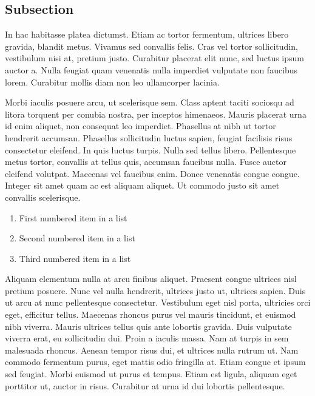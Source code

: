 \documentclass[10pt, a4paper, twocolumn]{article} %
\begin{document}

\subsection{Subsection}

In hac habitasse platea dictumst. Etiam ac tortor fermentum, ultrices libero gravida, blandit metus. Vivamus sed convallis felis. Cras vel tortor sollicitudin, vestibulum nisi at, pretium justo. Curabitur placerat elit nunc, sed luctus ipsum auctor a. Nulla feugiat quam venenatis nulla imperdiet vulputate non faucibus lorem. Curabitur mollis diam non leo ullamcorper lacinia.

Morbi iaculis posuere arcu, ut scelerisque sem. Class aptent taciti sociosqu ad litora torquent per conubia nostra, per inceptos himenaeos. Mauris placerat urna id enim aliquet, non consequat leo imperdiet. Phasellus at nibh ut tortor hendrerit accumsan. Phasellus sollicitudin luctus sapien, feugiat facilisis risus consectetur eleifend. In quis luctus turpis. Nulla sed tellus libero. Pellentesque metus tortor, convallis at tellus quis, accumsan faucibus nulla. Fusce auctor eleifend volutpat. Maecenas vel faucibus enim. Donec venenatis congue congue. Integer sit amet quam ac est aliquam aliquet. Ut commodo justo sit amet convallis scelerisque.

\begin{enumerate}
	\item First numbered item in a list
	\item Second numbered item in a list
	\item Third numbered item in a list
\end{enumerate}

Aliquam elementum nulla at arcu finibus aliquet. Praesent congue ultrices nisl pretium posuere. Nunc vel nulla hendrerit, ultrices justo ut, ultrices sapien. Duis ut arcu at nunc pellentesque consectetur. Vestibulum eget nisl porta, ultricies orci eget, efficitur tellus. Maecenas rhoncus purus vel mauris tincidunt, et euismod nibh viverra. Mauris ultrices tellus quis ante lobortis gravida. Duis vulputate viverra erat, eu sollicitudin dui. Proin a iaculis massa. Nam at turpis in sem malesuada rhoncus. Aenean tempor risus dui, et ultrices nulla rutrum ut. Nam commodo fermentum purus, eget mattis odio fringilla at. Etiam congue et ipsum sed feugiat. Morbi euismod ut purus et tempus. Etiam est ligula, aliquam eget porttitor ut, auctor in risus. Curabitur at urna id dui lobortis pellentesque.
\end{document}
